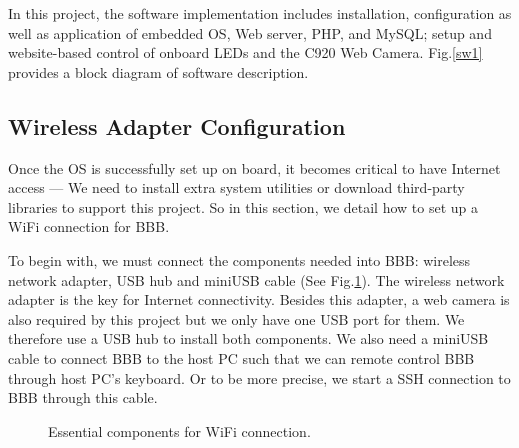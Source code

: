 \documentclass[13pt,journal,draftclsnofoot,onecolumn]{IEEEtran}
\begin{document}
In this project, the software implementation includes installation, configuration as well as application of embedded OS, Web server, PHP, and MySQL; setup and website-based control of onboard LEDs and the C920 Web Camera. Fig.\ref{sw1} provides a block diagram of software description.
	
\subsection{Wireless Adapter Configuration}\label{Wireless}
Once the OS is successfully set up on board, it becomes critical to have Internet access --- We need to install extra system utilities or download third-party libraries to support this project. So in this section, we detail how to set up a WiFi connection for BBB.

To begin with, we must connect the components needed into BBB: wireless network adapter, USB hub and miniUSB cable (See Fig.\ref{WiFi}). The wireless network adapter is the key for Internet connectivity. Besides this adapter, a web camera is also required by this project but we only have one USB port for them.  We therefore use a USB hub to install both components. We also need a miniUSB cable to connect BBB to the host PC such that we can remote control BBB through host PC's keyboard. Or to be more precise, we start a SSH connection to BBB through this cable.

\begin{figure}[htb]
	\centering
     \caption{Essential components for WiFi connection.}
     \label{WiFi}
     \end{figure}
\end{document}

